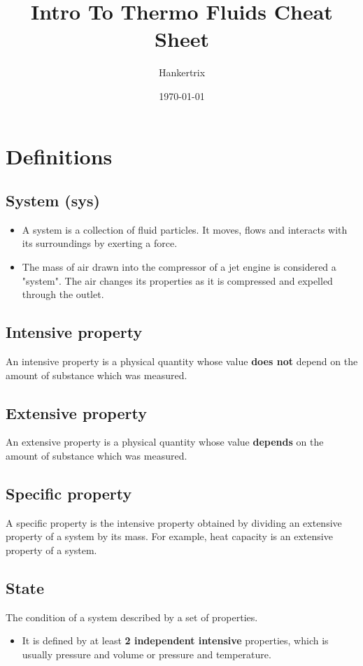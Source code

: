 \documentclass[11pt]{article}
\author{Hankertrix}
\date{\today}
\title{Intro To Thermo Fluids Cheat Sheet}
\begin{document}
\maketitle
\setcounter{tocdepth}{2}
\tableofcontents \clearpage
\section{Definitions}
\label{sec:org2a0949e}

\subsection{System (sys)}
\label{sec:org92922c5}
\begin{itemize}
\item A system is a collection of fluid particles. It moves, flows and interacts with its surroundings by exerting a force.
\item The mass of air drawn into the compressor of a jet engine is considered a "system". The air changes its properties as it is compressed and expelled through the outlet.
\end{itemize}

\subsection{Intensive property}
\label{sec:org0919cb5}
An intensive property is a physical quantity whose value \textbf{does not} depend on the amount of substance which was measured.

\subsection{Extensive property}
\label{sec:org04d8317}
An extensive property is a physical quantity whose value \textbf{depends} on the amount of substance which was measured.

\subsection{Specific property}
\label{sec:org3e3b0a8}
A specific property is the intensive property obtained by dividing an extensive property of a system by its mass. For example, heat capacity is an extensive property of a system.

\subsection{State}
\label{sec:orgad723dc}
The condition of a system described by a set of properties.
\begin{itemize}
\item It is defined by at least \textbf{2 independent intensive} properties, which is usually pressure and volume or pressure and temperature.
\end{itemize}
\end{document}
